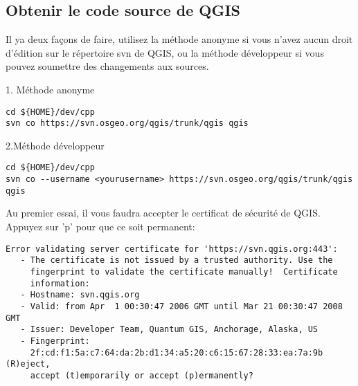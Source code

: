 \subsection{Obtenir le code source de QGIS}
Il ya deux façons de faire, utilisez la méthode anonyme si vous n'avez aucun droit d'édition sur le répertoire svn de QGIS, ou la méthode développeur si vous pouvez soumettre des changements aux sources.

1. Méthode anonyme

\begin{verbatim}
cd ${HOME}/dev/cpp 
svn co https://svn.osgeo.org/qgis/trunk/qgis qgis
\end{verbatim}

2.Méthode développeur

\begin{verbatim}
cd ${HOME}/dev/cpp 
svn co --username <yourusername> https://svn.osgeo.org/qgis/trunk/qgis qgis 
\end{verbatim}

Au premier essai, il vous faudra accepter le certificat de sécurité de QGIS. Appuyez sur 'p' pour que ce soit permanent:

\begin{verbatim}
Error validating server certificate for 'https://svn.qgis.org:443':
   - The certificate is not issued by a trusted authority. Use the
     fingerprint to validate the certificate manually!  Certificate
     information:
   - Hostname: svn.qgis.org
   - Valid: from Apr  1 00:30:47 2006 GMT until Mar 21 00:30:47 2008 GMT
   - Issuer: Developer Team, Quantum GIS, Anchorage, Alaska, US
   - Fingerprint:
     2f:cd:f1:5a:c7:64:da:2b:d1:34:a5:20:c6:15:67:28:33:ea:7a:9b (R)eject,
     accept (t)emporarily or accept (p)ermanently?  
\end{verbatim}

